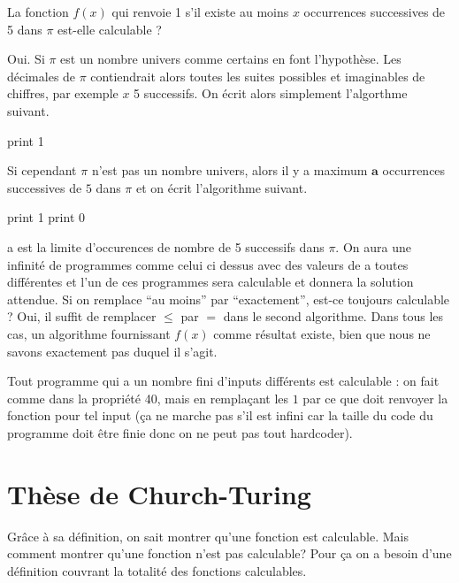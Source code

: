 \begin{myexem}
  La fonction $f(x)$ qui renvoie 1 s'il existe au moins $x$ occurrences successives de 5 dans $\pi$ est-elle calculable ?

  Oui. Si $\pi$  est un nombre univers comme certains en font l'hypothèse. Les décimales de $\pi$ contiendrait alors toutes les suites possibles et imaginables de chiffres, par exemple $x$ 5 successifs.
	On écrit alors simplement l'algorthme suivant.
  \begin{algorithmic}
    \STATE print 1
  \end{algorithmic}

  Si cependant $\pi$ n'est pas un nombre univers, alors il y a maximum $\mathbf{a}$ occurrences successives de $5$ dans $\pi$ et on écrit l'algorithme suivant.
  \begin{algorithmic}
    \STATE print 1
    \ELSE
    \STATE print 0
    \ENDIF
  \end{algorithmic}
a est la limite d'occurences de nombre de 5 successifs dans $\pi$. On aura une infinité de programmes comme celui ci dessus avec des valeurs de a toutes différentes et l'un de ces programmes sera calculable et donnera la solution attendue.
  Si on remplace ``au moins'' par ``exactement'', est-ce toujours calculable ?
  Oui, il suffit de remplacer $\leq$ par $=$ dans le second algorithme.
	Dans tous les cas, un algorithme fournissant $f(x)$ comme résultat existe, bien que nous ne savons exactement pas duquel il s'agit.
\end{myexem}

\begin{myprop}
  Tout programme qui a un nombre fini d'inputs différents est calculable : on fait comme dans la propriété 40, mais en remplaçant les $1$ par ce que doit renvoyer la fonction pour tel input (ça ne marche pas s'il est infini car la taille du code du programme doit être finie donc on ne peut pas tout hardcoder).
\end{myprop}


\section{Thèse de Church-Turing}
\label{sec:th_se_de_church_turing}
Grâce à sa définition, on sait montrer qu'une fonction est calculable. Mais comment
montrer qu'une fonction n'est pas calculable? Pour ça on a besoin d'une définition
couvrant la totalité des fonctions calculables.

